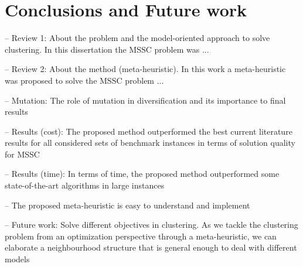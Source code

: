 \chapter{Conclusions and Future work}

-- Review 1: About the problem and the model-oriented approach to solve clustering.
In this dissertation the MSSC problem was ...

-- Review 2: About the method (meta-heuristic).
In this work a meta-heuristic was proposed to solve the MSSC problem ...

-- Mutation: The role of mutation in diversification and its importance to final results

-- Results (cost): The proposed method outperformed the best current literature results for all considered sets of benchmark
instances in terms of solution quality for MSSC

-- Results (time): In terms of time, the proposed method outperformed some state-of-the-art algorithms in large instances

-- The proposed meta-heuristic is easy to understand and implement

-- Future work: Solve different objectives in clustering. As we tackle the clustering problem from an optimization perspective through a meta-heuristic, we can elaborate a neighbourhood structure that is general enough to deal with different models